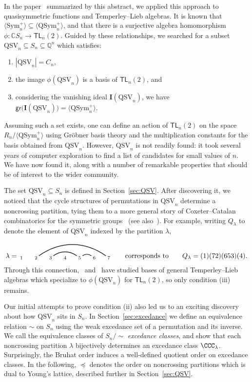 \documentclass[submission]{FPSAC2024}
\theoremstyle{definition}
\theoremstyle{remark}
\numberwithin{equation}{section}
\newcommand{\CC}{\mathbb{C}}
\newcommand{\QQ}{\mathbb{Q}}
\newcommand{\TL}{\mathsf{TL}}
\newcommand{\Sym}{\mathrm{Sym}}
\newcommand{\QSym}{\mathrm{QSym}}
\newcommand{\QSV}{\mathrm{QSV}}
\begin{document}
In the paper~\cite{BG} summarized by this abstract, we applied this approach to quasisymmetric functions and Temperley--Lieb algebras. 
It is known that $\langle \Sym_{n}^{+} \rangle \subseteq \langle \QSym_{n}^{+} \rangle$, and that there is a surjective algebra homomorphism $\phi: \CC S_{n} \to \TL_{n}(2)$. 
Guided by these relationships, we searched for a subset $\QSV_{n} \subseteq S_{n} \subseteq \QQ^{n}$ which satisfies:
\begin{enumerate}[itemsep = -.8ex, label=(\roman*)]
\item $|\QSV_{n}| = C_{n}$,
\item the image $\phi(\QSV_{n})$ is a basis of $\TL_{n}(2)$, and
\item considering the vanishing ideal $\mathbf{I}(\QSV_{n})$, we have $\mathsf{gr}\big(\mathbf{I}(\QSV_{n})\big) = \langle \QSym_{n}^{+} \rangle$.
\end{enumerate}
Assuming such a set exists, one can define an action of $\TL_{n}(2)$ on the space $R_{n}\big/\langle \QSym_{n}^{+} \rangle$ using Gr\"{o}bner basis theory and the multiplication constants for the basis obtained from $\QSV_{n}$.  
However, $\QSV_{n}$ is not readily found: it took several years of computer exploration to find a list of candidates for small values of $n$.  
We have now found it, along with a number of remarkable properties that should be of interest to the wider community.

The set $\QSV_{n} \subseteq S_{n}$ is defined in Section~\ref{sec:QSV}.  
After discovering it, we noticed that the cycle structures of permutations in $\QSV_{n}$ determine a noncrossing partition, tying them to a more general story of Coxeter--Catalan combinatorics for the symmetric groups~\cite{Baine} (see also~\cite{McCammond}).  
For example, writing $Q_{\lambda}$ to denote the element of $\QSV_{n}$ indexed by the partition $\lambda$,
\[
\lambda = \begin{tikzpicture}[scale = 0.75, baseline = 0.75*-0.2]
\foreach \x in {1, ..., 7}{\draw[fill] (\x - 1, 0) node[inner sep = 2pt] (\x) {$\scriptstyle \x$};}
\foreach \i\j in {5/6, 3/5,2/7}{\draw[thick] (\i) to[out = 35, in = 145] (\j);}
\end{tikzpicture}
\qquad\text{corresponds to}\qquad
Q_{\lambda} = (1)(72)(653)(4).
\]
Through this connection,~\cite{Gobet, GW16} and~\cite{Z02} have studied bases of general Temperley--Lieb algebras which specialize to $\phi(\QSV_{n})$ for $\TL_{n}(2)$, so only condition (iii) remains.

Our initial attempts to prove condition (ii) also led us to an exciting discovery about how $\QSV_{n}$ sits in $S_{n}$.  
In Section~\ref{sec:excedance} we define an equivalence relation $\sim$ on $S_{n}$ using the weak excedance set of a permutation and its inverse.  
We call the equivalence classes of $S_{n}\big/\!\!\sim$ \emph{excedance classes}, and show that each noncrossing partition $\lambda$ bijectively determines an excedance class $\CCC_{\lambda}$.  
Surprisingly, the Bruhat order induces a well-defined quotient order on excedance classes.  
In the following, $\preceq$ denotes the order on noncrossing partitions which is dual to Young's lattice, described further in Section~\ref{sec:QSV}.
\end{document}
